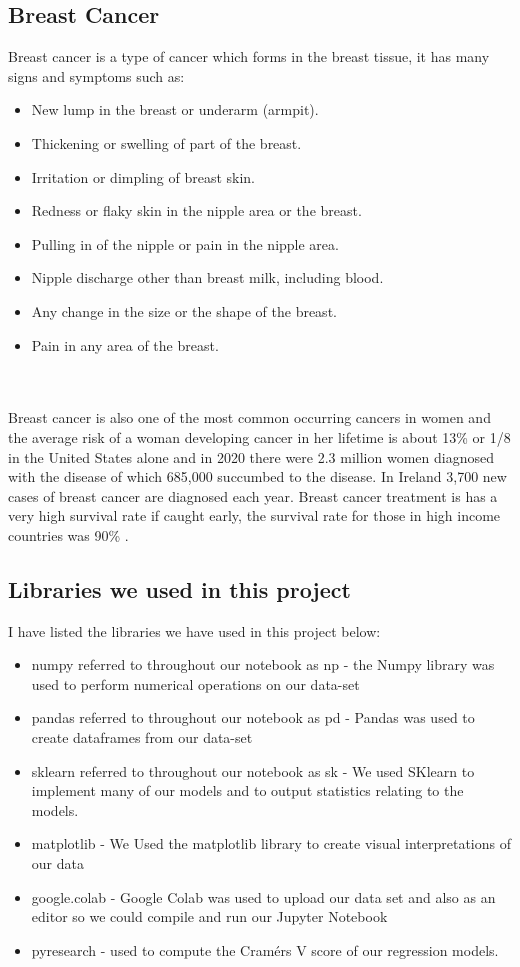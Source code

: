 \documentclass[conference]{IEEEtran}
\begin{document}
\subsection{Breast Cancer}
Breast cancer is a type of cancer which forms in the breast tissue, it has many signs and symptoms such as: 
\begin{itemize}
    \item New lump in the breast or underarm (armpit).
    \item Thickening or swelling of part of the breast.
    \item Irritation or dimpling of breast skin.
    \item Redness or flaky skin in the nipple area or the breast.
    \item Pulling in of the nipple or pain in the nipple area.
    \item Nipple discharge other than breast milk, including blood.
    \item Any change in the size or the shape of the breast.
    \item Pain in any area of the breast.
\end{itemize} \cite{symptomsofbreastcancer}
\\
\\
Breast cancer is also one of the most common occurring cancers in women and the average risk of a woman developing cancer in her lifetime is about 13\% or 1/8 in the United States alone\cite{howcommonisbreastcancer} and in 2020 there were 2.3 million women diagnosed with the disease of which 685,000 succumbed to the disease\cite{breastcancerstatistics}. In Ireland 3,700 new cases of breast cancer are diagnosed each year\cite{breastcancerireland}. Breast cancer treatment is has a very high survival rate if caught early, the survival rate for those in high income countries was 90\% \cite{breastcancerstatistics}.
\subsection{Libraries we used in this project}
I have listed the libraries we have used in this project below:
\begin{itemize}
    \item numpy referred to throughout our notebook as np\cite{numpy}  - the Numpy library was used to perform numerical operations on our data-set
    \item pandas referred to throughout our notebook as pd \cite{pandas} - Pandas was used to create dataframes from our data-set
    \item sklearn referred to throughout our notebook as sk \cite{sklearn} - We used SKlearn to implement many of our models and to output statistics relating to the models.
    \item matplotlib \cite{matplotlib} - We Used the matplotlib library to create visual interpretations of our data
    \item google.colab \cite{googlecolab} - Google Colab was used to upload our data set and also as an editor so we could compile and run our Jupyter Notebook\cite{jupyter}
    \item pyresearch - used to compute the Cramérs V score of our regression models.
\end{itemize}
\end{document}
